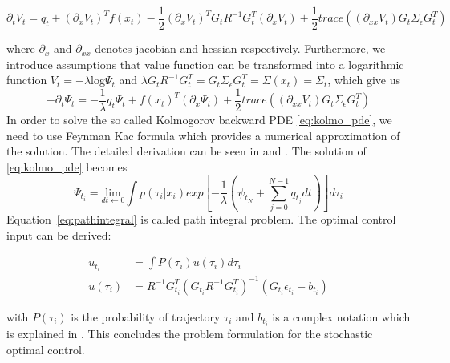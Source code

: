 \begin{equation}
\partial _tV_t = q_t + (\partial _xV_t)^Tf(x_t)-\frac{1}{2}(\partial _xV_t)^TG_tR^{-1}G_t^T(\partial _xV_t) + \frac{1}{2}trace((\partial _{xx}V_t)G_t\Sigma_{\epsilon}G_t^T)
\end{equation}

where $ \partial _x $ and $ \partial _{xx} $ denotes jacobian and hessian respectively. Furthermore, we introduce assumptions that value function can be transformed into a logarithmic function $V_t = -\lambda$log$\Psi_t$ and $\lambda G_tR^{-1}G_t^T = G_t\Sigma_{\epsilon}G_t^T = \Sigma(x_t) = \Sigma_t$, which give us
\begin{equation}
-\partial _t\Psi_t = -\frac{1}{\lambda}q_t\Psi_t+ f(x_t)^T(\partial _x\Psi_t) + \frac{1}{2}trace((\partial _{xx}V_t)G_t\Sigma_{\epsilon}G_t^T)
\label{eq:kolmo_pde}
\end{equation}
In order to solve the so called Kolmogorov backward \ac {PDE} \eqref{eq:kolmo_pde}, we need to use Feynman Kac formula which provides a numerical approximation of the solution. The detailed derivation can be seen in \cite{oksendal2010} and \cite{5509336}. The solution of \eqref{eq:kolmo_pde} becomes
\begin{equation}
\Psi_{t_i} =  \underset{dt \leftarrow 0}{\text{lim}} \int p(\tau_i|x_i)exp \left[ -\frac{1}{\lambda}\left( \psi_{t_N} + \sum\limits_{j=0}^{N-1}q_{t_j}dt\right)\right] d\tau_i 
\label{eq:pathintegral} 
\end{equation}
Equation~\eqref{eq:pathintegral} is called path integral problem. The optimal control input can be derived:

\begin{equation}
\begin{split}
u_{t_i} &= \int P(\tau_i) u(\tau_i) d\tau_i \\
u(\tau_i) &= R^{-1}G_{t_i}^T(G_{t_i}R^{-1}G_{t_i}^T)^{-1}(G_{t_i}\epsilon_{t_i}-b_{t_i}) 
\end{split}
\end{equation}

with $P(\tau_i)$ is the probability of trajectory $\tau_i$ and $b_{t_i}$ is a complex notation which is explained in \cite{5509336}. This concludes the problem formulation for the stochastic optimal control.

